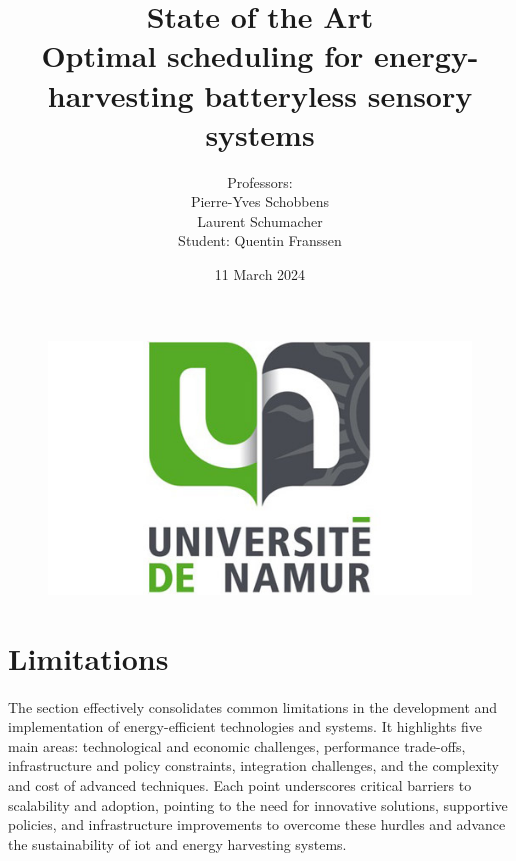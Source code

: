 \documentclass[12pt,a4paper]{article}
\title{State of the Art\\Optimal scheduling for energy-harvesting batteryless sensory systems}
\author{Professors:\\Pierre-Yves Schobbens\\Laurent Schumacher\\Student: Quentin Franssen}
\date{11 March 2024}
\begin{document}
    

    \begin{figure}
        \centering
        \includegraphics[scale=0.5]{img/UNamur_Logo.jpg}
        \label{fig:lgo_unamur}
    \end{figure}
    
    \maketitle
    \newpage

    
    \tableofcontents

    \newpage

    \newpage

    \newpage

    \newpage

    \newpage
    \section{Limitations}

        \paragraph{}
        The section effectively consolidates common limitations in the development and implementation of energy-efficient technologies and systems. It highlights five main areas: technological and economic challenges, performance trade-offs, infrastructure and policy constraints, integration challenges, and the complexity and cost of advanced techniques. Each point underscores critical barriers to scalability and adoption, pointing to the need for innovative solutions, supportive policies, and infrastructure improvements to overcome these hurdles and advance the sustainability of \gls{iot} and energy harvesting systems.
\end{document}
